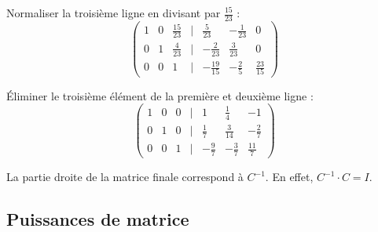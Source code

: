 \documentclass[10pt,a4paper]{article}
\begin{document}
\begin{enumerate}
    Normaliser la troisième ligne en divisant par $\frac{15}{23}$ :
    $$
    \begin{pmatrix}
    1 & 0 & \frac{15}{23} & | & \frac{5}{23} & -\frac{1}{23} & 0 \\
    0 & 1 & \frac{4}{23} & | & -\frac{2}{23} & \frac{3}{23} & 0 \\
    0 & 0 & 1 & | & -\frac{19}{15} & -\frac{2}{5} & \frac{23}{15}
    \end{pmatrix}
    $$

    Éliminer le troisième élément de la première et deuxième ligne :
    $$
    \begin{pmatrix}
    1 & 0 & 0 & | & 1 & \frac{1}{4} & -1 \\
    0 & 1 & 0 & | & \frac{1}{7} & \frac{3}{14} & -\frac{2}{7} \\
    0 & 0 & 1 & | & -\frac{9}{7} & -\frac{3}{7} & \frac{11}{7}
    \end{pmatrix}
    $$

    La partie droite de la matrice finale correspond à $C^{-1}$.
    En effet, $ C^{-1}\cdot C = I$.

\end{enumerate}

\subsection*{Puissances de matrice}
\end{document}
